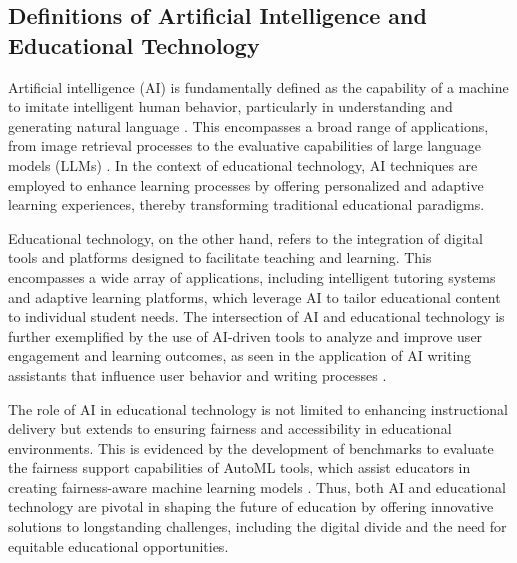 \subsection{Definitions of Artificial Intelligence and Educational Technology} \label{subsec:Definitions of Artificial Intelligence and Educational Technology}



Artificial intelligence (AI) is fundamentally defined as the capability of a machine to imitate intelligent human behavior, particularly in understanding and generating natural language \cite{GPT-4Techn0}. This encompasses a broad range of applications, from image retrieval processes \cite{jang2024visualdeltageneratorlarge} to the evaluative capabilities of large language models (LLMs) \cite{oh2024generativeaiparadoxevaluation}. In the context of educational technology, AI techniques are employed to enhance learning processes by offering personalized and adaptive learning experiences, thereby transforming traditional educational paradigms.



Educational technology, on the other hand, refers to the integration of digital tools and platforms designed to facilitate teaching and learning. This encompasses a wide array of applications, including intelligent tutoring systems and adaptive learning platforms, which leverage AI to tailor educational content to individual student needs. The intersection of AI and educational technology is further exemplified by the use of AI-driven tools to analyze and improve user engagement and learning outcomes, as seen in the application of AI writing assistants that influence user behavior and writing processes \cite{benharrak2024deceptivepatternsintelligentinteractive}.



The role of AI in educational technology is not limited to enhancing instructional delivery but extends to ensuring fairness and accessibility in educational environments. This is evidenced by the development of benchmarks to evaluate the fairness support capabilities of AutoML tools, which assist educators in creating fairness-aware machine learning models \cite{narayanan2023democratizecareneedfairness}. Thus, both AI and educational technology are pivotal in shaping the future of education by offering innovative solutions to longstanding challenges, including the digital divide and the need for equitable educational opportunities.



